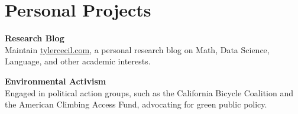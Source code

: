 \documentclass{tc_cv}
\begin{document}
\begin{minipage}[t]{0.3\linewidth}
  \vspace{2em}
  \section{Personal Projects}
  \textbf{Research Blog}\\
  Maintain \href{https://tylercecil.com}{\ul{tylercecil.com}}, a personal
  research blog on Math, Data Science, Language, and other academic interests.
  \vspace{0.25em}

  \textbf{Environmental Activism}\\
  Engaged in political action groups, such as the California Bicycle Coalition
  and the American Climbing Access Fund, advocating for green public policy.


\end{minipage}
\hfill\vline\hfill
\end{document}

